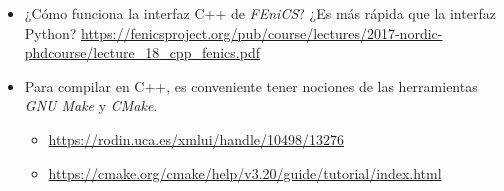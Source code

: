 \begin{itemize}
\item ¿Cómo funciona la interfaz C++ de \textit{FEniCS}? ¿Es más rápida que la interfaz Python? \url{https://fenicsproject.org/pub/course/lectures/2017-nordic-phdcourse/lecture_18_cpp_fenics.pdf}

\item Para compilar en C++, es conveniente tener nociones de las herramientas \textit{GNU Make} y \textit{CMake}.
  \begin{itemize}
  \item \url{https://rodin.uca.es/xmlui/handle/10498/13276}
  \item \url{https://cmake.org/cmake/help/v3.20/guide/tutorial/index.html}
  \end{itemize}
\end{itemize}


